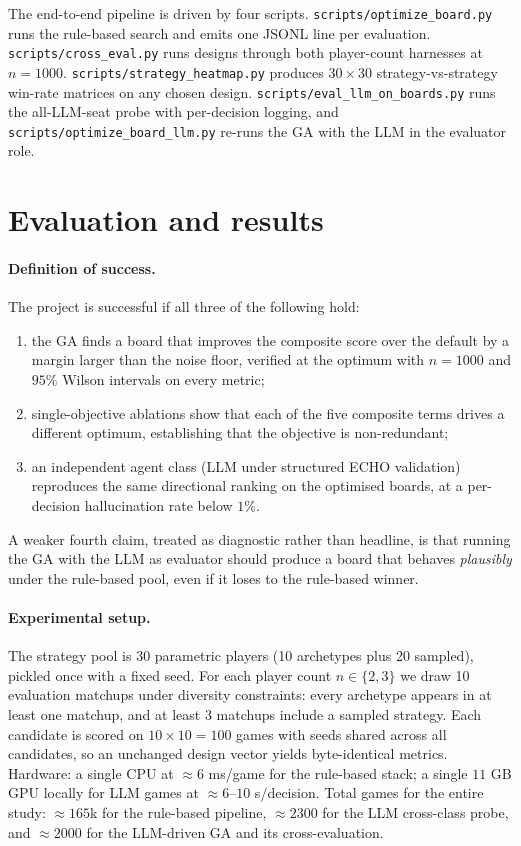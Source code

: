 \documentclass[10pt]{article}
\begin{document}
The end-to-end pipeline is driven by four scripts.
\texttt{scripts/optimize\_board.py} runs the rule-based search and
emits one JSONL line per evaluation. \texttt{scripts/cross\_eval.py}
runs designs through both player-count harnesses at $n{=}1000$.
\texttt{scripts/strategy\_heatmap.py} produces $30{\times}30$
strategy-vs-strategy win-rate matrices on any chosen design.
\texttt{scripts/eval\_llm\_on\_boards.py} runs the all-LLM-seat probe
with per-decision logging, and \texttt{scripts/optimize\_board\_llm.py}
re-runs the GA with the LLM in the evaluator role.

\section{Evaluation and results}\label{sec:eval}

\paragraph{Definition of success.} The project is successful if all
three of the following hold:
\begin{enumerate}[leftmargin=1.4em,itemsep=1pt]
\item the GA finds a board that improves the composite score over the
default by a margin larger than the noise floor, verified at the
optimum with $n{=}1000$ and $95\%$ Wilson intervals on every metric;
\item single-objective ablations show that each of the five composite
terms drives a different optimum, establishing that the objective is
non-redundant;
\item an independent agent class (LLM under structured ECHO
validation) reproduces the same directional ranking on the optimised
boards, at a per-decision hallucination rate below $1\%$.
\end{enumerate}
A weaker fourth claim, treated as diagnostic rather than headline, is
that running the GA with the LLM as evaluator should produce a board
that behaves \emph{plausibly} under the rule-based pool, even if it
loses to the rule-based winner.

\paragraph{Experimental setup.} The strategy pool is 30 parametric
players (10 archetypes plus 20 sampled), pickled once with a fixed
seed. For each player count $n\in\{2,3\}$ we draw 10 evaluation
matchups under diversity constraints: every archetype appears in at
least one matchup, and at least 3 matchups include a sampled
strategy. Each candidate is scored on $10\times 10 = 100$ games with
seeds shared across all candidates, so an unchanged design vector
yields byte-identical metrics. Hardware: a single CPU at
$\approx 6$ ms/game for the rule-based stack; a single $11$ GB GPU
locally for LLM games at
$\approx 6$--$10$ s/decision. Total games for the entire study:
$\approx 165$k for the rule-based pipeline, $\approx 2300$ for the
LLM cross-class probe, and $\approx 2000$ for the LLM-driven GA and
its cross-evaluation.
\end{document}
